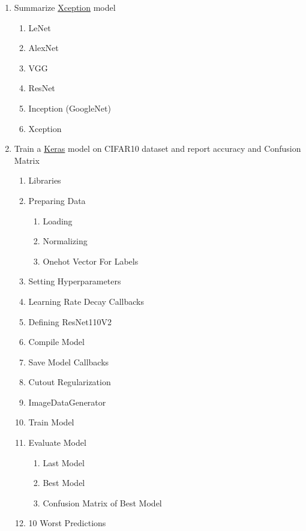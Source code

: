 \documentclass[11pt]{article}
\providecommand{\tightlist}{%
      \setlength{\itemsep}{0pt}\setlength{\parskip}{0pt}}
\begin{document}
\begin{enumerate}
\def\labelenumi{\arabic{enumi}.}
\setcounter{enumi}{1}
\tightlist
\item
  Summarize
  \href{http://openaccess.thecvf.com/content_cvpr_2017/papers/Chollet_Xception_Deep_Learning_CVPR_2017_paper.pdf}{Xception}
  model

  \begin{enumerate}
  \def\labelenumii{\arabic{enumii}.}
  \tightlist
  \item
    LeNet
  \item
    AlexNet
  \item
    VGG
  \item
    ResNet
  \item
    Inception (GoogleNet)
  \item
    Xception
  \end{enumerate}
\item
  Train a \href{https://keras.io/}{Keras} model on CIFAR10 dataset and
  report accuracy and Confusion Matrix

  \begin{enumerate}
  \def\labelenumii{\arabic{enumii}.}
  \tightlist
  \item
    Libraries
  \item
    Preparing Data

    \begin{enumerate}
    \def\labelenumiii{\arabic{enumiii}.}
    \tightlist
    \item
      Loading
    \item
      Normalizing
    \item
      Onehot Vector For Labels
    \end{enumerate}
  \item
    Setting Hyperparameters
  \item
    Learning Rate Decay Callbacks
  \item
    Defining ResNet110V2
  \item
    Compile Model
  \item
    Save Model Callbacks
  \item
    Cutout Regularization
  \item
    ImageDataGenerator
  \item
    Train Model
  \item
    Evaluate Model

    \begin{enumerate}
    \def\labelenumiii{\arabic{enumiii}.}
    \tightlist
    \item
      Last Model
    \item
      Best Model
    \item
      Confusion Matrix of Best Model
    \end{enumerate}
  \item
    10 Worst Predictions
  \end{enumerate}
\end{enumerate}
\end{document}
